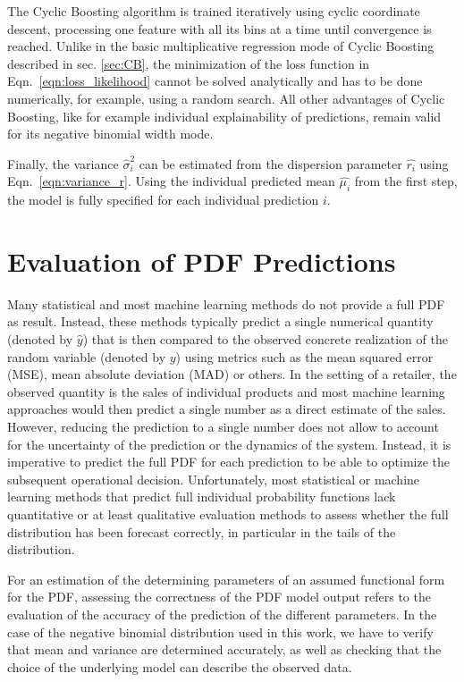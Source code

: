 \documentclass[BCOR=1mm, DIV=calc,10pt,
twoside=true,
twocolumn,
headings=normal]{scrartcl}
\newcommand{\eqn}{Eqn.~}
\begin{document}
The Cyclic Boosting algorithm is trained iteratively using cyclic coordinate descent, processing one feature with all its bins at a time until convergence is reached. Unlike in the basic multiplicative regression mode of Cyclic Boosting described in sec. \ref{sec:CB}, the minimization of the loss function in \eqn \eqref{eqn:loss_likelihood} cannot be solved analytically and has to be done numerically, for example, using a random search. All other advantages of Cyclic Boosting, like for example individual explainability of predictions, remain valid for its negative binomial width mode.

Finally, the variance $\hat{\sigma}^2_i$ can be estimated from the dispersion parameter $\hat{r_i}$ using \eqn \eqref{eqn:variance_r}. Using  the individual predicted mean $\hat{\mu_i}$ from the first step, the model is fully specified for each individual prediction $i$.


\section{Evaluation of PDF Predictions}
\label{sec:pdfEvaluation}

Many statistical and most machine learning methods do not provide a full PDF as result. Instead, these methods typically predict a single numerical quantity (denoted by $\hat{y}$) that is then compared to the observed concrete realization of the random variable (denoted by $y$) using metrics such as the mean squared error (MSE), mean absolute deviation (MAD) or others. In the setting of a retailer, the observed quantity is the sales of individual products and most machine learning approaches would then predict a single number as a direct estimate of the sales. However, reducing the prediction to a single number does not allow to account for the uncertainty of the prediction or the dynamics of the system. Instead, it is imperative to predict the full PDF for each prediction to be able to optimize the subsequent operational decision. Unfortunately, most statistical or machine learning methods that predict full individual probability functions lack quantitative or at least qualitative evaluation methods to assess whether the full distribution has been forecast correctly, in particular in the tails of the distribution.

For an estimation of the determining parameters of an assumed functional form for the PDF, assessing the correctness of the PDF model output refers to the evaluation of the accuracy of the prediction of the different parameters. In the case of the negative binomial distribution used in this work, we have to verify that mean and variance are determined accurately, as well as checking that the choice of the underlying model can describe the observed data.
\end{document}
